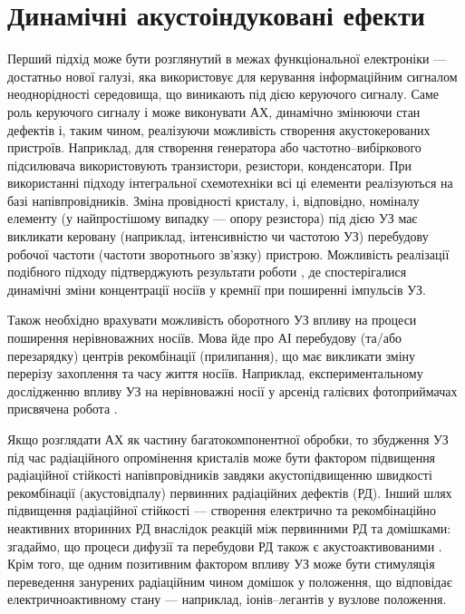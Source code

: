 \section{Динамічні акустоіндуковані ефекти}

Перший підхід може бути розглянутий в межах функціональної електроніки --- достатньо нової галузі,
яка використовує для керування інформаційним сигналом неоднорідності середовища,  що виникають під дією керуючого сигналу.
Саме роль керуючого сигналу і може виконувати АХ, динамічно змінюючи стан дефектів і, таким чином, реалізуючи можливість створення акустокерованих пристроїв.
Наприклад, для створення генератора або частотно--вибіркового підсилювача використовують транзистори, резистори, конденсатори.
При використанні підходу інтегральної схемотехніки всі ці елементи реалізуються на базі напівпровідників.
Зміна провідності кристалу, і, відповідно, номіналу елементу (у найпростішому випадку --- опору резистора) під дією УЗ
має викликати керовану (наприклад, інтенсивністю чи частотою УЗ) перебудову робочої частоти (частоти зворотнього зв'язку) пристрою.
Можливість реалізації подібного підходу підтверджують результати роботи \cite{YOlikhTPL2011r}, де спостерігалися динамічні зміни концентрації носіїв у кремнії при поширенні імпульсів УЗ.

Також необхідно врахувати можливість оборотного УЗ впливу на процеси поширення нерівноважних носіїв.
Мова йде про АІ перебудову (та/або перезарядку)  центрів рекомбінації (прилипання), що має викликати зміну перерізу захоплення та часу життя носіїв.
Наприклад, експериментальному дослідженню впливу УЗ на нерівноважні носії у арсенід галієвих фотоприймачах присвячена робота \cite{Zaveryukhin2002:2}.

Якщо розглядати АХ як частину багатокомпонентної обробки, то збудження УЗ під час радіаційного опромінення кристалів може бути фактором підвищення радіаційної стійкості напівпровідників завдяки акустопідвищенню швидкості рекомбінації (акустовідпалу) первинних радіаційних дефектів (РД).
Інший шлях підвищення радіаційної стійкості --- створення електрично та рекомбінаційно неактивних вторинних РД внаслідок реакцій між первинними РД та домішками: згадаймо, що процеси дифузії та перебудови РД також є акустоактивованими \cite{YOlikh2006TPLr,Parchinskii2000r}.
Крім того, ще одним позитивним фактором впливу УЗ може бути стимуляція переведення занурених радіаційним чином домішок у положення, що відповідає електричноактивному стану --- наприклад, іонів--легантів у вузлове положення.

